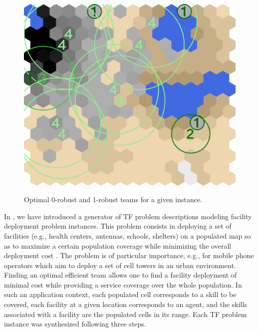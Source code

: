 \documentclass[conference]{IEEEtran}
\theoremstyle{definition}
\begin{document}
\begin{figure}[tp]
{		\label{subfig:map-solutionKTF}
		\includegraphics[width=\widthmap\textwidth]{TF-1-KTF-k1}
	}
	\caption{Optimal 0-robust and 1-robust teams for a given instance.}
	\label{fig:map-solution}
\end{figure}

In \cite{schwind2021}, we have introduced
a generator of TF problem descriptions
modeling facility deployment problem instances.
This problem consists in deploying a set of facilities 
(e.g., health centers, antennas, schools, shelters) on a populated map
so as to maximize a certain population coverage while minimizing the overall deployment cost \cite{fac}.
The problem is of particular importance, e.g., for mobile phone operators
which aim to deploy a set of cell towers in an urban environment.
Finding an optimal efficient team allows one to find a facility deployment
of minimal cost while providing a service coverage over
the whole population.
In such an application context, each populated cell corresponds to a skill to be covered,
each facility at a given location corresponds to an agent,
and the skills associated with a facility are the populated cells in its range.
Each TF problem instance was synthesized following three steps.
\end{document}
